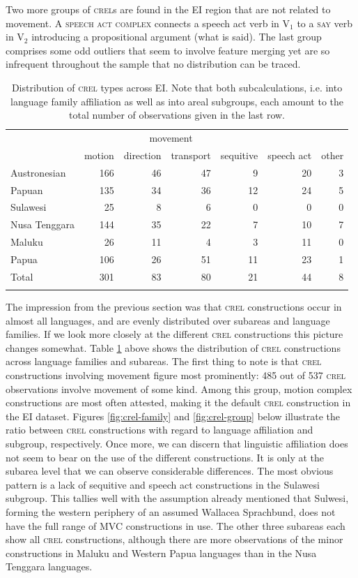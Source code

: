 Two more groups of \textsc{crel}s are found in the EI region that are not related to movement. A \textsc{speech act complex} connects a speech act verb in V$_1$ to a \textsc{say} verb in V$_2$ introducing a propositional argument (what is said). The last group comprises some odd outliers that seem to involve feature merging yet are so infrequent throughout the sample that no distribution can be traced.

\begin{table}
\begin{tabular}{lrrrr|rr}
  \lsptoprule
& \multicolumn{4}{c}{movement} & & \\
 & {motion} & {direction} & {transport} & {sequitive} & {speech act} & {other}\\  
  \midrule
  Austronesian & 166 & 46 & 47 & 9 & 20 & 3 \tabularnewline
  Papuan & 135 & 34 &  36 &  12 & 24 & 5 \tabularnewline
   \midrule
  Sulawesi & 25 & 8 & 6 & 0 & 0 & 0 \tabularnewline
  Nusa Tenggara & 144 & 35 & 22 & 7 & 10 & 7 \tabularnewline
  Maluku & 26 & 11 & 4 & 3 & 11 & 0 \tabularnewline 
  Papua & 106 & 26 & 51 & 11 & 23 & 1 \tabularnewline 
\midrule
Total & 301 & 83 & 80 & 21 & 44 & 8 \tabularnewline
\lspbottomrule
\end{tabular}
\caption[Distribution of \textsc{crel} types]{Distribution of \textsc{crel} types across EI. Note that both subcalculations, i.e. into language family affiliation as well as into areal subgroups, each amount to the total number of observations given in the last row.}
\label{table:CREL_overview}
\end{table}

The impression from the previous section was that \textsc{crel} constructions occur in almost all languages, and are evenly distributed over subareas and language families. If we look more closely at the different \textsc{crel} constructions this picture changes somewhat. Table \ref{table:CREL_overview} above shows the distribution of \textsc{crel} constructions across language families and subareas. The first thing to note is that \textsc{crel} constructions involving movement figure most prominently: 485 out of 537 \textsc{crel} observations involve movement of some kind. Among this group, motion complex constructions are most often attested, making it the default \textsc{crel} construction in the EI dataset. Figures \ref{fig:crel-family} and \ref{fig:crel-group} below illustrate the ratio between \textsc{crel} constructions with regard to language affiliation and subgroup, respectively. Once more, we can discern that linguistic affiliation does not seem to bear on the use of the different constructions. It is only at the subarea level that we can observe considerable differences. The most obvious pattern is a lack of sequitive and speech act constructions in the Sulawesi subgroup. This tallies well with the assumption already mentioned that Sulwesi, forming the western periphery of an assumed Wallacea Sprachbund, does not have the full range of MVC constructions in use. The other three subareas each show all \textsc{crel} constructions, although there are more observations of the minor constructions in Maluku and Western Papua languages than in the Nusa Tenggara languages.

